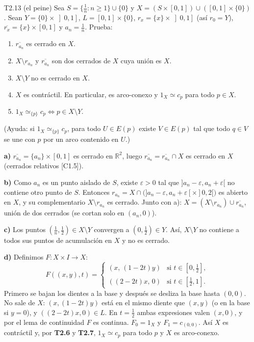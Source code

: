 \begin{ejercicio}{T2.13 (el peine)}
Sea $S = \{\frac1n : n \geq 1\} \cup \{0\}$ y $X = (S \times [0,1]) \cup ([0,1] \times \{0\})$. Sean $Y = \{0\} \times \left]0,1\right]$, $L = [0,1] \times \{0\}$, $r_x = \{x\} \times \left]0,1\right]$ (así $r_0 = Y$), $\overline{r_x} = \{x\} \times [0,1]$ y $a_n = \frac1n$. Prueba:
\begin{enumerate}
    \item[a)] $\overline{r_{a_n}}$ es cerrado en $X$.
    \item[b)] $X \setminus r_{a_n}$ y $\overline{r_{a_n}}$ son dos cerrados de $X$ cuya unión es $X$.
    \item[c)] $X \setminus Y$ no es cerrado en $X$.
    \item[d)] $X$ es contráctil. En particular, es arco-conexo y $1_X \simeq c_p$ para todo $p \in X$.
    \item[e)] $1_X \simeq_{\{p\}} c_p \iff p \in X \setminus Y$.
\end{enumerate}
(Ayuda: si $1_X \simeq_{\{p\}} c_p$, para todo $U \in E(p)$ existe $V \in E(p)$ tal que todo $q \in V$ se une con $p$ por un arco contenido en $U$.)

\sol \fuentepropia

\textbf{a)} $\overline{r_{a_n}} = \{a_n\} \times [0,1]$ es cerrado en $\mathbb{R}^2$, luego $\overline{r_{a_n}} = \overline{r_{a_n}} \cap X$ es cerrado en $X$ (cerrados relativos [C1.5]).

\textbf{b)} Como $a_n$ es un punto aislado de $S$, existe $\varepsilon > 0$ tal que $]a_n - \varepsilon, a_n + \varepsilon[$ no contiene otro punto de $S$. Entonces $r_{a_n} = X \cap \big(]a_n - \varepsilon, a_n + \varepsilon[ \times ]0,2[\big)$ es abierto en $X$, y su complementario $X \setminus r_{a_n}$ es cerrado. Junto con a): $X = (X \setminus r_{a_n}) \cup \overline{r_{a_n}}$, unión de dos cerrados (se cortan solo en $(a_n,0)$).

\textbf{c)} Los puntos $(\frac1n,\frac12) \in X \setminus Y$ convergen a $(0,\frac12) \in Y$. Así, $X \setminus Y$ no contiene a todos sus puntos de acumulación en $X$ y no es cerrado.

\textbf{d)} Definimos $F \colon X \times I \to X$:
\[ F((x,y),t) = \begin{cases} (x,\,(1-2t)y) & \text{si } t \in [0,\frac12], \\ ((2-2t)x,\,0) & \text{si } t \in [\frac12,1]. \end{cases} \]
Primero se bajan los dientes a la base y después se desliza la base hasta $(0,0)$. No sale de $X$: $(x,(1-2t)y)$ está en el mismo diente que $(x,y)$ (o en la base si $y = 0$), y $((2-2t)x,0) \in L$. En $t = \frac12$ ambas expresiones valen $(x,0)$, y por el lema de continuidad $F$ es continua. $F_0 = 1_X$ y $F_1 = c_{(0,0)}$. Así $X$ es contráctil y, por \textbf{T2.6} y \textbf{T2.7}, $1_X \simeq c_p$ para todo $p$ y $X$ es arco-conexo.


\end{ejercicio}
